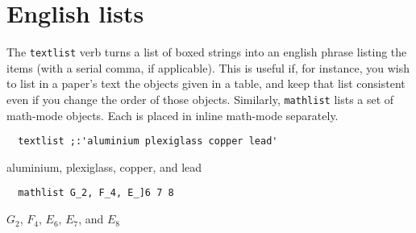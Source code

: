 \documentclass{article}
\begin{document}
\section{English lists}
The \lstinline`textlist` verb turns a list of boxed strings into an english phrase
listing the items (with a serial comma, if applicable). This is useful if,
for instance, you wish to list in a paper's text the objects given in a
table, and keep that list consistent even if you change the order of those
objects.
Similarly, \lstinline`mathlist` lists a set of math-mode objects. Each is placed
in inline math-mode separately.
\begin{lstlisting}
  textlist ;:'aluminium plexiglass copper lead'
\end{lstlisting}
aluminium, plexiglass, copper, and lead
\begin{lstlisting}
  mathlist G_2, F_4, E_]6 7 8
\end{lstlisting}
$G_2$, $F_4$, $E_6$, $E_7$, and $E_8$
\end{document}
